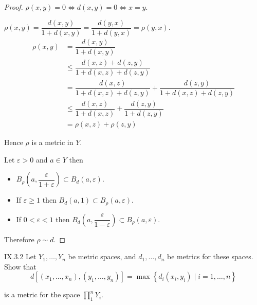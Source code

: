 \begin{proof}
	\( \rho(x, y) = 0 \iff d(x, y) = 0 \iff x = y \).

	\( \rho(x, y) = \dfrac{d(x, y)}{1 + d(x, y)} = \dfrac{d(y, x)}{1 + d(y, x)} = \rho(y, x) \).
	\begingroup
	\allowdisplaybreaks%
	\begin{align*}
		\rho(x, y) & = \dfrac{d(x, y)}{1 + d(x, y)}                                                    \\
		           & \le \dfrac{d(x, z) + d(z, y)}{1 + d(x, z) + d(z, y)}                              \\
		           & = \dfrac{d(x, z)}{1 + d(x, z) + d(z, y)} + \dfrac{d(z, y)}{1 + d(x, z) + d(z, y)} \\
		           & \le \dfrac{d(x, z)}{1 + d(x, z)} + \dfrac{d(z, y)}{1 + d(z, y)}                   \\
		           & = \rho(x, z) + \rho(z, y)
	\end{align*}
	\endgroup

	Hence \( \rho \) is a metric in \( Y \).
	\bigskip

	Let \( \varepsilon > 0 \) and \( a \in Y \) then
	\begin{itemize}
		\item \( B_{\rho}\left(a, \dfrac{\varepsilon}{1 + \varepsilon}\right) \subset B_{d}(a, \varepsilon) \).
		\item If \( \varepsilon \ge 1 \) then \( B_{d}(a, 1) \subset B_{\rho}(a, \varepsilon) \).
		\item If \( 0 < \varepsilon < 1 \) then \( B_{d}\left( a, \dfrac{\varepsilon}{1 - \varepsilon} \right) \subset B_{\rho}(a, \varepsilon) \).
	\end{itemize}

	Therefore \( \rho \sim d \).
\end{proof}

\begin{problem}{IX.3.2}
Let \( Y_{1}, \ldots, Y_{n} \) be metric spaces, and \( d_{1}, \ldots, d_{n} \) be metrics for these spaces. Show that
\[
	d[(x_{1}, \ldots, x_{n}), (y_{1}, \ldots, y_{n})] = \max\left\{ d_{i}(x_{i}, y_{i}) \mid i = 1, \ldots, n \right\}
\]

is a metric for the space \( \prod^{n}_{1} Y_{i} \).
\end{problem}

